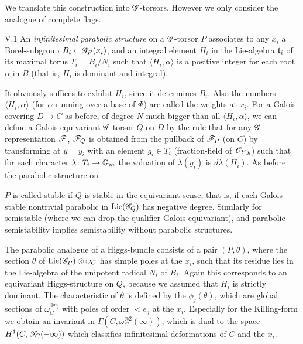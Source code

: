 \documentclass[12pt,english]{smfart}
\theoremstyle{plain} \newtheorem{innerthm}{Theorem} \newtheorem{innerlem}{Lemma} \newtheorem{innerprop}{Proposition} \newtheorem{innercor}{Corollary} \theoremstyle{definition} \newtheorem{innerdefn}{Definition} \newtheorem{innerconstr}{Construction} \theoremstyle{remark} \newtheorem*{remark}{Remark} \newtheorem*{remarks}{Remarks} \newtheorem*{applications}{Applications}
\begin{document}
We translate this construction into $\mathscr{G}$-torsors. However we only consider the analogue of complete flags.

\begin{definition}{V.1}\label{def:V.1}
An \textit{infinitesimal parabolic structure} on a $\mathscr{G}$-torsor $P$ associates to any $x_i$ a Borel-subgroup $B_i\subset\mathscr{G}_P(x_i)$, and an integral element $H_i$ in the Lie-algebra $\mathfrak{t}_i$ of its maximal torus $T_i=B_i/N_i$ such that $\langle H_i,\alpha\rangle$ is a positive integer for each root $\alpha$ in $B$ (that is, $H_i$ is dominant and integral).
\end{definition}

It obviously suffices to exhibit $H_i$, since it determines $B_i$. Also the numbers $\langle H_i,\alpha\rangle$ (for $\alpha$ running over a base of $\Phi$) are called the weights at $x_i$. For a Galois-covering $D\to C$ as before, of degree $N$ much bigger than all $\langle H_i,\alpha\rangle$, we can define a Galois-equivariant $\mathscr{G}$-torsor $Q$ on $D$ by the rule that for any $\mathscr{G}$-representation $\mathscr{F}$, $\mathscr{F}_Q$ is obtained from the pullback of $\mathscr{F}_P$ (on $C$) by transforming at $y=y_i$ with an element $g_i\in T_i$ (fraction-field of $\mathscr{O}_{Y,y}$) such that for each character $\lambda\colon T_i\to\mathbb{G}_m$ the valuation of $\lambda(g_i)$ is $d\lambda(H_i)$. As before the parabolic structure on


$P$ is called stable if $Q$ is stable in the equivariant sense; that is, if each Galois-stable nontrivial parabolic in $\operatorname{Lie}(\mathscr{G}_Q)$ has negative degree. Similarly for semistable (where we can drop the qualifier Galois-equivariant), and parabolic semistability implies semistability without parabolic structures.

The parabolic analogue of a Higgs-bundle consists of a pair $(P,\theta)$, where the section $\theta$ of $\operatorname{Lie}(\mathscr{G}_P)\otimes\omega_C$ has simple poles at the $x_i$, such that its residue lies in the Lie-algebra of the unipotent radical $N_i$ of $B_i$. Again this corresponds to an equivariant Higgs-structure on $Q$, because we assumed that $H_i$ is strictly dominant. The characteristic of $\theta$ is defined by the $\phi_j(\theta)$, which are global sections of $\omega_C^{\otimes e_j}$ with poles of order $<e_j$ at the $x_i$. Especially for the Killing-form we obtain an invariant in $\Gamma(C,\omega_C^{\otimes2}(\infty))$, which is dual to the space $H^1(C,\mathscr{T}_C(-\infty))$ which classifies infinitesimal deformations of $C$ and the $x_i$.
\end{document}

